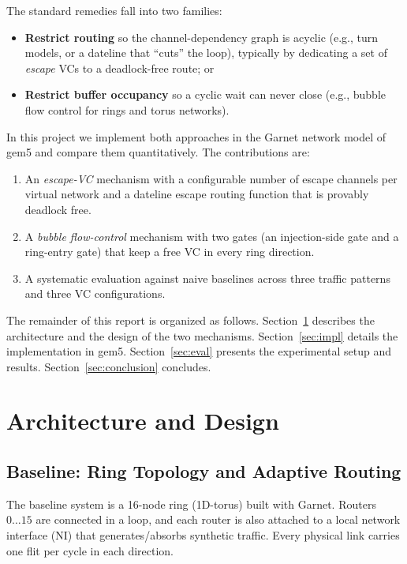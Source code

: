 \documentclass[11pt,a4paper]{article}
\begin{document}
The standard remedies fall into two families:

\begin{itemize}[itemsep=1pt, topsep=2pt]
  \item \textbf{Restrict routing} so the channel-dependency graph is acyclic
        (e.g., turn models, or a dateline that ``cuts'' the loop), typically by
        dedicating a set of \emph{escape} VCs to a deadlock-free route; or
  \item \textbf{Restrict buffer occupancy} so a cyclic wait can never close
        (e.g., bubble flow control for rings and torus networks).
\end{itemize}

In this project we implement both approaches in the Garnet network model of
gem5 and compare them quantitatively.  The contributions are:

\begin{enumerate}[itemsep=1pt, topsep=2pt]
  \item An \emph{escape-VC} mechanism with a configurable number of escape
        channels per virtual network and a dateline escape routing function
        that is provably deadlock free.
  \item A \emph{bubble flow-control} mechanism with two gates (an
        injection-side gate and a ring-entry gate) that keep a free VC in every
        ring direction.
  \item A systematic evaluation against naive baselines across three traffic
        patterns and three VC configurations.
\end{enumerate}

The remainder of this report is organized as follows.  Section~\ref{sec:arch}
describes the architecture and the design of the two mechanisms.
Section~\ref{sec:impl} details the implementation in gem5.  Section~\ref{sec:eval}
presents the experimental setup and results.  Section~\ref{sec:conclusion}
concludes.

\section{Architecture and Design}
\label{sec:arch}

\subsection{Baseline: Ring Topology and Adaptive Routing}
The baseline system is a 16-node ring (1D-torus) built with Garnet.  Routers
$0 \ldots 15$ are connected in a loop, and each router is also attached to a
local network interface (NI) that generates/absorbs synthetic traffic.  Every
physical link carries one flit per cycle in each direction.
\end{document}
